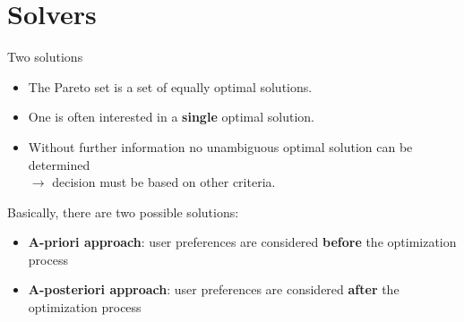 %
%
%

\section{Solvers}

\begin{frame}[allowframebreaks]{Two solutions}

\begin{itemize}
\item The Pareto set is a set of equally optimal solutions.
\item One is often interested in a \textbf{single} optimal solution.
\item Without further information no unambiguous optimal solution can be determined \\
$\to$ decision must be based on other criteria.
\end{itemize}

Basically, there are two possible solutions:
\begin{itemize}
\item \textbf{A-priori approach}: user preferences are considered \textbf{before} the optimization process
\item \textbf{A-posteriori approach}: user preferences are considered \textbf{after} the optimization process
\end{itemize}

\end{frame}


